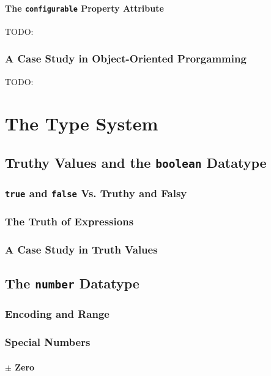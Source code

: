 \documentclass[11pt,letter]{book}
\begin{document}
    \subsection{The \texttt{configurable} Property Attribute}
    TODO:
    
    \section{A Case Study in Object-Oriented Prorgamming}
    TODO:
    
    \part{The Type System}
    
    \chapter{Truthy Values and the \texttt{boolean} Datatype}
    
    \section{\texttt{true} and \texttt{false} Vs. Truthy and Falsy}
    
    \section{The Truth of Expressions}
    
    \section{A Case Study in Truth Values}
    
    \chapter{The \texttt{number} Datatype}
    
    \section{Encoding and Range}
    
    \section{Special Numbers}
    
    \subsection{$\pm$ Zero}
    
\end{document}
